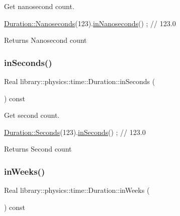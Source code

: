 Get nanosecond count. 


\begin{DoxyCode}
\hyperlink{classlibrary_1_1physics_1_1time_1_1_duration_a6a629b2275337fbadac912cc9364a9f1}{Duration::Nanoseconds}(123).\hyperlink{classlibrary_1_1physics_1_1time_1_1_duration_a45aa358d61481356dd591290d6ab3691}{inNanoseconds}() ; \textcolor{comment}{// 123.0}
\end{DoxyCode}


\begin{DoxyReturn}{Returns}
Nanosecond count 
\end{DoxyReturn}
\mbox{\label{classlibrary_1_1physics_1_1time_1_1_duration_a9272debd96e7f86df9b0852c6663a0bb}} 
\subsubsection{\texorpdfstring{in\+Seconds()}{inSeconds()}}
{\footnotesize\ttfamily Real library\+::physics\+::time\+::\+Duration\+::in\+Seconds (\begin{DoxyParamCaption}{ }\end{DoxyParamCaption}) const}



Get second count. 


\begin{DoxyCode}
\hyperlink{classlibrary_1_1physics_1_1time_1_1_duration_ae10891c94a1b2278c444cb44b37132f1}{Duration::Seconds}(123).\hyperlink{classlibrary_1_1physics_1_1time_1_1_duration_a9272debd96e7f86df9b0852c6663a0bb}{inSeconds}() ; \textcolor{comment}{// 123.0}
\end{DoxyCode}


\begin{DoxyReturn}{Returns}
Second count 
\end{DoxyReturn}
\mbox{\label{classlibrary_1_1physics_1_1time_1_1_duration_ae49243cf87ccf07693b65e7170642b65}} 
\subsubsection{\texorpdfstring{in\+Weeks()}{inWeeks()}}
{\footnotesize\ttfamily Real library\+::physics\+::time\+::\+Duration\+::in\+Weeks (\begin{DoxyParamCaption}{ }\end{DoxyParamCaption}) const}



